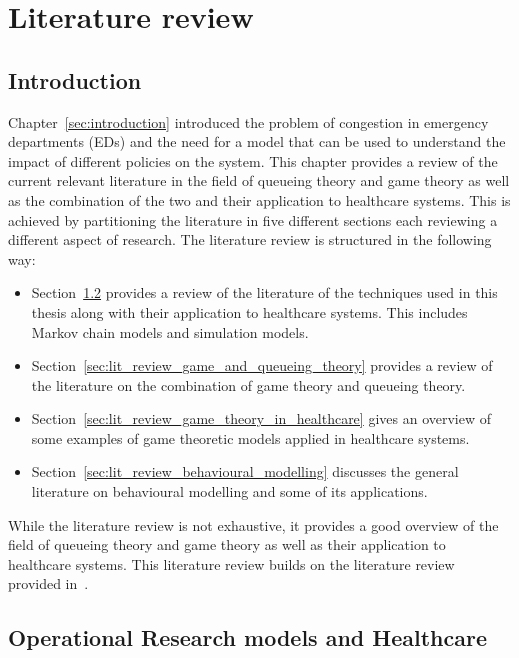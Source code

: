 \chapter{Literature review}
\label{sec:lit_review}

\section{Introduction}\label{sec:lit_review_intro}

Chapter~\ref{sec:introduction} introduced the problem of congestion in
emergency departments (EDs) and the need for a model that can be used to
understand the impact of different policies on the system.
This chapter provides a review of the current relevant literature in the field
of queueing theory and game theory as well as the combination of the two and
their application to healthcare systems.
This is achieved by partitioning the literature in five different sections each
reviewing a different aspect of research.
The literature review is structured in the following way:

\begin{itemize}
    \item Section~\ref{sec:lit_review_OR_healthcare} provides a review of the
        literature of the techniques used in this thesis along with their
        application to healthcare systems.
        This includes Markov chain models and simulation models.
    \item Section~\ref{sec:lit_review_game_and_queueing_theory} provides a
        review of the literature on the combination of game theory and queueing
        theory.
    \item Section~\ref{sec:lit_review_game_theory_in_healthcare} gives an
        overview of some examples of game theoretic models applied in
        healthcare systems.
    \item Section~\ref{sec:lit_review_behavioural_modelling} discusses the
        general literature on behavioural modelling and some of its
        applications.
\end{itemize}

While the literature review is not exhaustive, it provides a good overview of
the field of queueing theory and game theory as well as their application to
healthcare systems.
This literature review builds on the literature review provided
in~\cite{panayides2023game}.


\section{Operational Research models and Healthcare}
\label{sec:lit_review_OR_healthcare}

